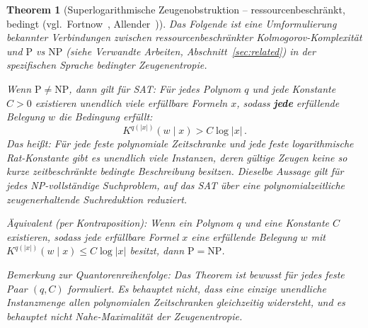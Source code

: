 \documentclass[aps,prd,twocolumn,superscriptaddress,nofootinbib]{revtex4-2}
\newtheorem{theorem}{Theorem}[section]
\theoremstyle{definition}
\theoremstyle{remark}
\newcommand{\NP}{\mathrm{NP}}
\newcommand{\PP}{\mathrm{P}}
\begin{document}
\begin{theorem}[Superlogarithmische Zeugenobstruktion -- ressourcenbeschränkt, bedingt {\normalfont (vgl.\ Fortnow~\cite{Fortnow2000}, Allender~\cite{Allender2001})}]
\label{thm:high_entropy}
Das Folgende ist eine Umformulierung bekannter Verbindungen zwischen ressourcenbeschränkter Kolmogorov-Komplexität und $\PP$ vs $\NP$ (siehe Verwandte Arbeiten, Abschnitt~\ref{sec:related}) in der spezifischen Sprache bedingter Zeugenentropie.

Wenn $\PP \neq \NP$, dann gilt für SAT: Für jedes Polynom $q$ und jede Konstante $C>0$ existieren unendlich viele erfüllbare Formeln $x$, sodass \textbf{jede} erfüllende Belegung $w$ die Bedingung erfüllt:
\begin{equation}
K^{q(|x|)}(w \mid x) > C \log |x|\,.
\label{eq:high_entropy}
\end{equation}
Das heißt: Für jede feste polynomiale Zeitschranke und jede feste logarithmische Rat-Konstante gibt es unendlich viele Instanzen, deren gültige Zeugen keine so kurze zeitbeschränkte bedingte Beschreibung besitzen. Dieselbe Aussage gilt für jedes NP-vollständige Suchproblem, auf das SAT über eine polynomialzeitliche zeugenerhaltende Suchreduktion reduziert.

Äquivalent (per Kontraposition): Wenn ein Polynom $q$ und eine Konstante $C$ existieren, sodass jede erfüllbare Formel $x$ eine erfüllende Belegung $w$ mit $K^{q(|x|)}(w \mid x) \leq C\log |x|$ besitzt, dann $\PP = \NP$.

Bemerkung zur Quantorenreihenfolge: Das Theorem ist bewusst für jedes feste Paar $(q,C)$ formuliert. Es behauptet \emph{nicht}, dass eine einzige unendliche Instanzmenge allen polynomialen Zeitschranken gleichzeitig widersteht, und es behauptet \emph{nicht} Nahe-Maximalität der Zeugenentropie.
\end{theorem}
\end{document}
